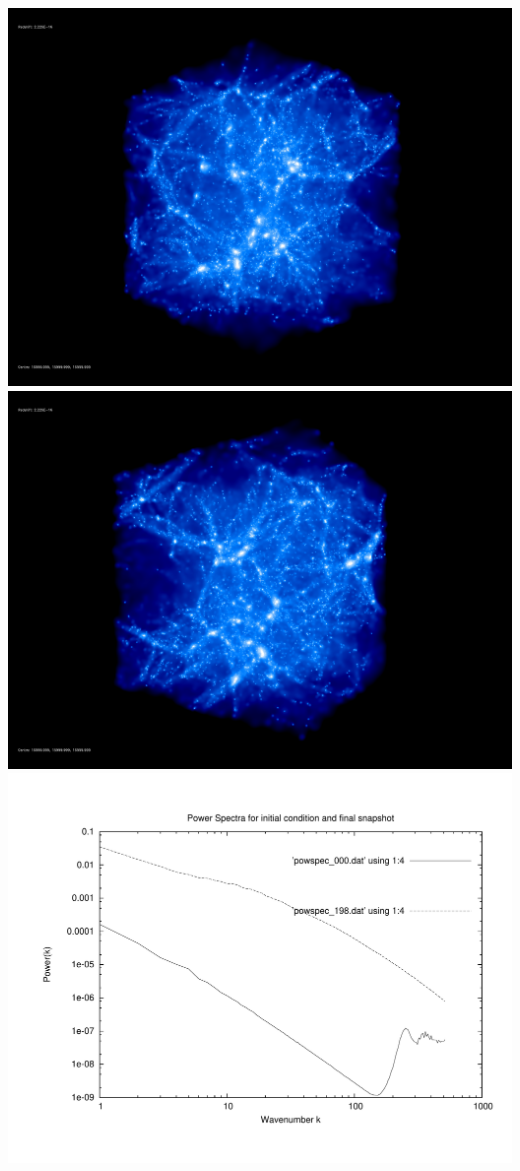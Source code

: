 \includegraphics[scale=0.1]{stages_37/rotate_00074.jpg} 
\includegraphics[scale=0.1]{stages_37/rotate_00131.jpg}  \\

\includegraphics[scale=0.5]{stages_37/plot_powspec_stages_37}


